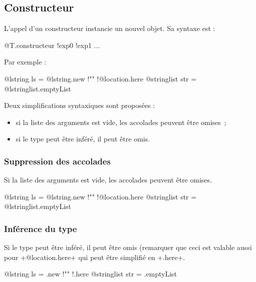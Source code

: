 








\subsection{Constructeur}

L'appel d'un constructeur instancie un nouvel objet. Sa syntaxe est :

\begin{galgasbox}
@T.constructeur {!exp0 !exp1 ...}
\end{galgasbox}

Par exemple :
\begin{galgas}
@lstring ls = @lstring.new {!"" !@location.here{}}
@stringlist str = @lstringlist.emptyList {}
\end{galgas}

Deux simplifications syntaxiques sont proposées :
\begin{itemize}
  \item si la liste des arguments est vide, les accolades peuvent être omises~;
  \item si le type peut être inféré, il peut être omis.
\end{itemize}


\subsubsection{Suppression des accolades}

Si la liste des arguments est vide, les accolades peuvent être omises.

\begin{galgas}
@lstring ls = @lstring.new {!"" !@location.here}
@stringlist str = @lstringlist.emptyList
\end{galgas}



\subsubsection{Inférence du type}

Si le type peut être inféré, il peut être omis (remarquer que ceci est valable aussi pour \ggs+@location.here+ qui peut être simplifié en \ggs+.here+.

\begin{galgas}
@lstring ls = .new {!"" !.here}
@stringlist str = .emptyList
\end{galgas}








